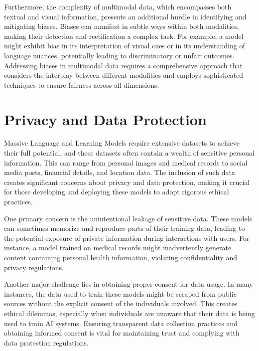 Furthermore, the complexity of multimodal data, which encompasses both textual and visual information, presents an additional hurdle in identifying and mitigating biases. Biases can manifest in subtle ways within both modalities, making their detection and rectification a complex task. For example, a model might exhibit bias in its interpretation of visual cues or in its understanding of language nuances, potentially leading to discriminatory or unfair outcomes. Addressing biases in multimodal data requires a comprehensive approach that considers the interplay between different modalities and employs sophisticated techniques to ensure fairness across all dimensions.

\section{Privacy and Data Protection}

Massive Language and Learning Models require extensive datasets to achieve their full potential, and these datasets often contain a wealth of sensitive personal information. This can range from personal images and medical records to social media posts, financial details, and location data. The inclusion of such data creates significant concerns about privacy and data protection, making it crucial for those developing and deploying these models to adopt rigorous ethical practices.

One primary concern is the unintentional leakage of sensitive data. These models can sometimes memorize and reproduce parts of their training data, leading to the potential exposure of private information during interactions with users. For instance, a model trained on medical records might inadvertently generate content containing personal health information, violating confidentiality and privacy regulations\cite{brown2022does, yao2024survey, pan2020privacy}.

Another major challenge lies in obtaining proper consent for data usage. In many instances, the data used to train these models might be scraped from public sources without the explicit consent of the individuals involved. This creates ethical dilemmas, especially when individuals are unaware that their data is being used to train AI systems. Ensuring transparent data collection practices and obtaining informed consent is vital for maintaining trust and complying with data protection regulations\cite{weidinger2021ethical, brown2022does, zhang2024right, weidinger2022taxonomy}.


